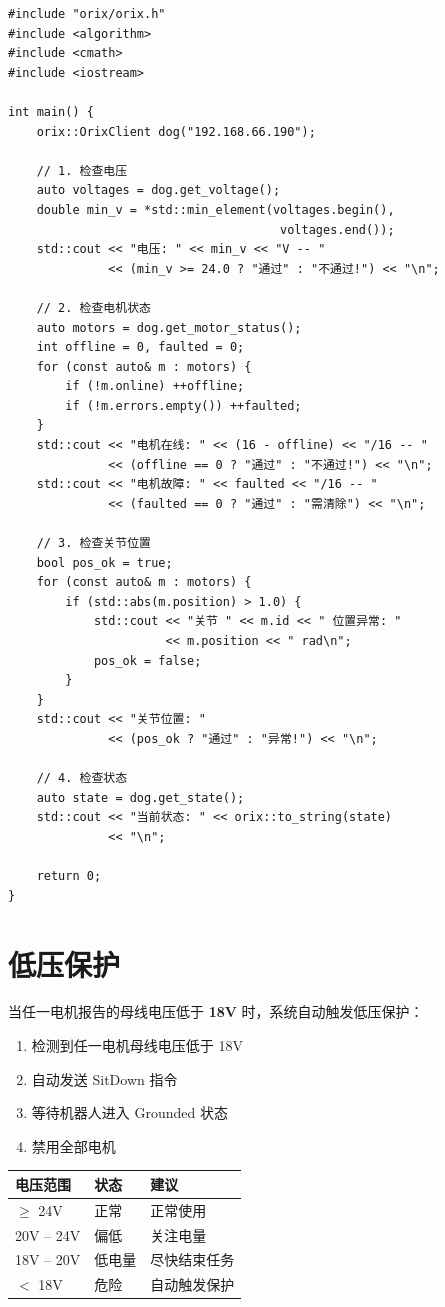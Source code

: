\documentclass[a4paper,11pt,openany]{book}
\begin{document}
\begin{lstlisting}[style=cpp]
#include "orix/orix.h"
#include <algorithm>
#include <cmath>
#include <iostream>

int main() {
    orix::OrixClient dog("192.168.66.190");

    // 1. 检查电压
    auto voltages = dog.get_voltage();
    double min_v = *std::min_element(voltages.begin(),
                                      voltages.end());
    std::cout << "电压: " << min_v << "V -- "
              << (min_v >= 24.0 ? "通过" : "不通过!") << "\n";

    // 2. 检查电机状态
    auto motors = dog.get_motor_status();
    int offline = 0, faulted = 0;
    for (const auto& m : motors) {
        if (!m.online) ++offline;
        if (!m.errors.empty()) ++faulted;
    }
    std::cout << "电机在线: " << (16 - offline) << "/16 -- "
              << (offline == 0 ? "通过" : "不通过!") << "\n";
    std::cout << "电机故障: " << faulted << "/16 -- "
              << (faulted == 0 ? "通过" : "需清除") << "\n";

    // 3. 检查关节位置
    bool pos_ok = true;
    for (const auto& m : motors) {
        if (std::abs(m.position) > 1.0) {
            std::cout << "关节 " << m.id << " 位置异常: "
                      << m.position << " rad\n";
            pos_ok = false;
        }
    }
    std::cout << "关节位置: "
              << (pos_ok ? "通过" : "异常!") << "\n";

    // 4. 检查状态
    auto state = dog.get_state();
    std::cout << "当前状态: " << orix::to_string(state)
              << "\n";

    return 0;
}
\end{lstlisting}

\section{低压保护}

当任一电机报告的母线电压低于 \textbf{18V} 时，系统自动触发低压保护：

\begin{enumerate}[nosep]
  \item 检测到任一电机母线电压低于 18V
  \item 自动发送 SitDown 指令
  \item 等待机器人进入 Grounded 状态
  \item 禁用全部电机
\end{enumerate}

\begin{longtable}{lll}
\toprule
电压范围 & 状态 & 建议 \\
\midrule
\endhead
$\geq$ 24V & 正常 & 正常使用 \\
20V -- 24V & 偏低 & 关注电量 \\
18V -- 20V & 低电量 & 尽快结束任务 \\
$<$ 18V & 危险 & 自动触发保护 \\
\bottomrule
\end{longtable}
\end{document}
